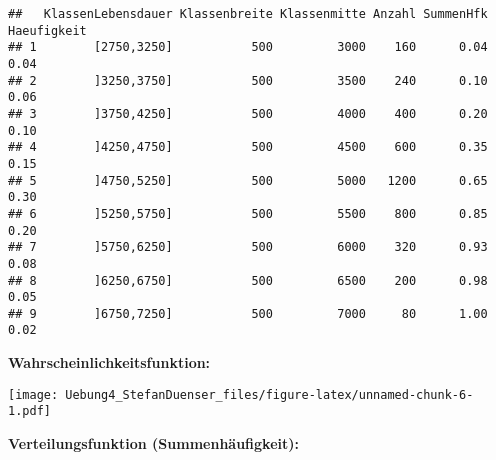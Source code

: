 \documentclass[
]{article}
\newenvironment{Shaded}{\begin{snugshade}}{\end{snugshade}}
\newcommand{\AttributeTok}[1]{\textcolor[rgb]{0.77,0.63,0.00}{#1}}
\newcommand{\CommentTok}[1]{\textcolor[rgb]{0.56,0.35,0.01}{\textit{#1}}}
\newcommand{\DecValTok}[1]{\textcolor[rgb]{0.00,0.00,0.81}{#1}}
\newcommand{\FloatTok}[1]{\textcolor[rgb]{0.00,0.00,0.81}{#1}}
\newcommand{\FunctionTok}[1]{\textcolor[rgb]{0.00,0.00,0.00}{#1}}
\newcommand{\NormalTok}[1]{#1}
\newcommand{\SpecialCharTok}[1]{\textcolor[rgb]{0.00,0.00,0.00}{#1}}
\newcommand{\StringTok}[1]{\textcolor[rgb]{0.31,0.60,0.02}{#1}}
\begin{document}
\begin{verbatim}
##   KlassenLebensdauer Klassenbreite Klassenmitte Anzahl SummenHfk Haeufigkeit
## 1        [2750,3250]           500         3000    160      0.04        0.04
## 2        ]3250,3750]           500         3500    240      0.10        0.06
## 3        ]3750,4250]           500         4000    400      0.20        0.10
## 4        ]4250,4750]           500         4500    600      0.35        0.15
## 5        ]4750,5250]           500         5000   1200      0.65        0.30
## 6        ]5250,5750]           500         5500    800      0.85        0.20
## 7        ]5750,6250]           500         6000    320      0.93        0.08
## 8        ]6250,6750]           500         6500    200      0.98        0.05
## 9        ]6750,7250]           500         7000     80      1.00        0.02
\end{verbatim}

\textbf{Wahrscheinlichkeitsfunktion:}\\

\begin{Shaded}
\end{Shaded}

\texttt{[image: Uebung4\_StefanDuenser\_files/figure-latex/unnamed-chunk-6-1.pdf]}

\textbf{Verteilungsfunktion (Summenhäufigkeit):}\\
\end{document}
